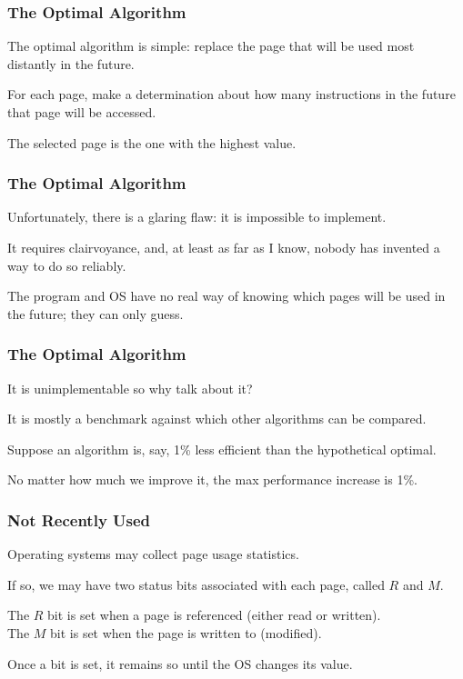 \begin{frame}
\frametitle{The Optimal Algorithm}

The optimal algorithm is simple: replace the page that will be used most distantly in the future. 

For each page, make a determination about how many instructions in the future that page will be accessed. 

The selected page is the one with the highest value.


\end{frame}

\begin{frame}
\frametitle{The Optimal Algorithm}

Unfortunately, there is a glaring flaw: it is impossible to implement. 

It requires clairvoyance, and, at least as far as I know, nobody has invented a way to do so reliably. 

The program and OS have no real way of knowing which pages will be used in the future; they can only guess.

\end{frame}

\begin{frame}
\frametitle{The Optimal Algorithm}

It is unimplementable so why talk about it?

It is mostly a benchmark against which other algorithms can be compared. 

Suppose an algorithm is, say, 1\% less efficient than the hypothetical optimal.

No matter how much we improve it, the max performance increase is 1\%.


\end{frame}

\begin{frame}
\frametitle{Not Recently Used}

Operating systems may collect page usage statistics. 

If so, we may have two status bits associated with each page, called $R$ and $M$.

The $R$ bit is set when a page is referenced (either read or written).\\
The $M$ bit is set when the page is written to (modified). 

Once a bit is set, it remains so until the OS changes its value. 


\end{frame}

